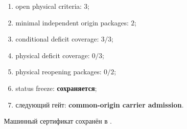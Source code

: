 \begin{protocol}\begin{enumerate}
\item open physical criteria: \textbf{$3$};
\item minimal independent origin packages: \textbf{$2$};
\item conditional deficit coverage: \textbf{$3/3$};
\item physical deficit coverage: \textbf{$0/3$};
\item physical reopening packages: \textbf{$0/2$};
\item status freeze: \textbf{сохраняется};
\item следующий гейт: \textbf{common-origin carrier admission}.
\end{enumerate}\end{protocol}

Машинный сертификат сохранён в
.